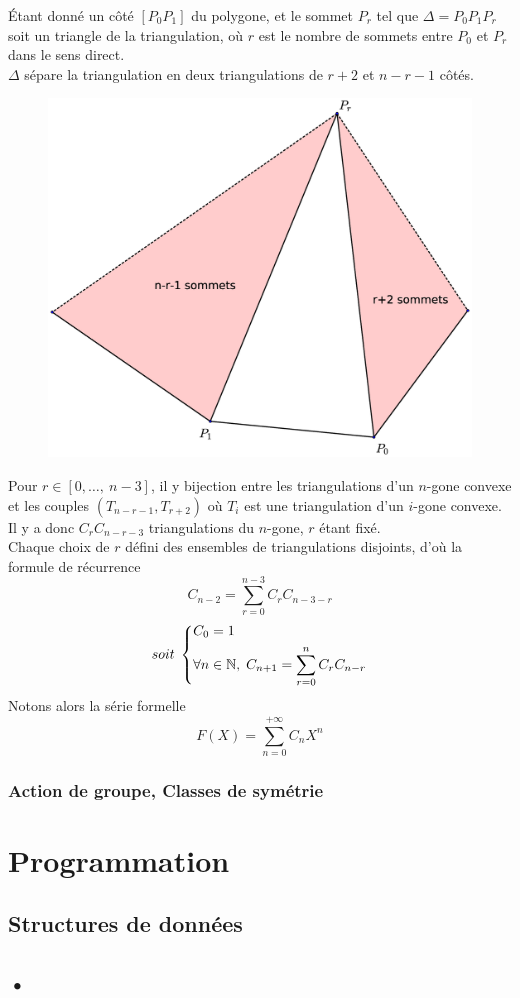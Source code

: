 \documentclass[10pt,a4paper]{article}
\begin{document}
			Étant donné un côté $[P_{0}P_{1}]$ du polygone, et le sommet $P_{r}$ tel que $\Delta = P_{0}P_{1}P_{r}$ soit un triangle de la triangulation, où $r$ est le nombre de sommets entre $P_{0}$ et $P_{r}$ dans le sens direct.\\
			$\Delta$ sépare la triangulation en deux triangulations de $r+2$ et $n-r-1$ côtés.\\
			\begin{figure}[h]
				\centering
				\includegraphics[scale=0.25]{nombres_catalan.eps}
			\end{figure}
			Pour $r\in [0,\ldots,\:n-3]$, il y bijection entre les triangulations d'un $n$-gone convexe et les couples $(T_{n-r-1},T_{r+2})$ où $T_{i}$ est une triangulation d'un $i$-gone convexe.\\
			Il y a donc $C_{r}C_{n-r-3}$ triangulations du $n$-gone, $r$ étant fixé.\\
			Chaque choix de $r$ défini des ensembles de triangulations disjoints, d'où la formule de récurrence
			\[C_{n-2} = \sum_{r=0}^{n-3}{C_{r}C_{n-3-r}}\] 
			\[soit\;
				\begin{dcases*}
		        C_{0} = 1\\
		        \forall n\in\mathbb{N},\; C_{n+1} = \sum_{r=0}^{n}{C_{r}C_{n-r}}
		        \end{dcases*}
			\]
			Notons alors la série formelle $$F(X) = \sum_{n=0}^{+\infty}{C_{n}X^{n}}$$
			

		\subsubsection{Action de groupe, Classes de symétrie}



\section{Programmation}

	\subsection{Structures de données}
	
	\subsection{•}
\end{document}
